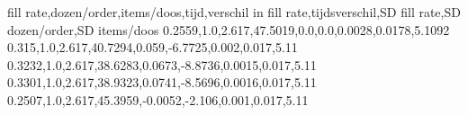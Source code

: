 fill rate,dozen/order,items/doos,tijd,verschil in fill rate,tijdsverschil,SD fill rate,SD dozen/order,SD items/doos
0.2559,1.0,2.617,47.5019,0.0,0.0,0.0028,0.0178,5.1092
0.315,1.0,2.617,40.7294,0.059,-6.7725,0.002,0.017,5.11
0.3232,1.0,2.617,38.6283,0.0673,-8.8736,0.0015,0.017,5.11
0.3301,1.0,2.617,38.9323,0.0741,-8.5696,0.0016,0.017,5.11
0.2507,1.0,2.617,45.3959,-0.0052,-2.106,0.001,0.017,5.11
